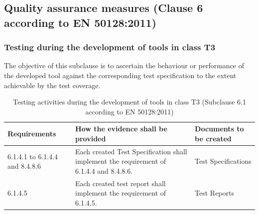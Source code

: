 \documentclass{template/openetcs_report}
\begin{document}
\subsection{Quality assurance measures (Clause 6 according to EN 50128:2011)}
\label{clause6}
\subsubsection{Testing during the development of tools in class T3}
\begin{flushleft}
The objective of this subclause is to ascertain the behaviour or performance of the developed tool against the corresponding test specification to the extent achievable by the test coverage.
\end{flushleft}
{\footnotesize\sffamily\centering
\begin{longtable}{|p{2cm}|p{9cm}|p{3cm}|}
\caption{Testing activities during the development of tools in class T3 (Subclause 6.1 according to EN 50128:2011)}\\
\hline
\bfseries Requirements & \bfseries How the evidence shall be provided & \bfseries Documents to be created\\
\hline
\hline
\endhead
\hline
\endfoot

6.1.4.1 to 6.1.4.4 and 8.4.8.6 & Each created Test Specification shall implement the requirement of 6.1.4.4 and 8.4.8.6.
& Test Specifications \\ 
\hline
6.1.4.5 & Each created test report shall implement the requirement of 6.1.4.5.
& Test Reports \\ 
\hline
\end{longtable}}
\end{document}
